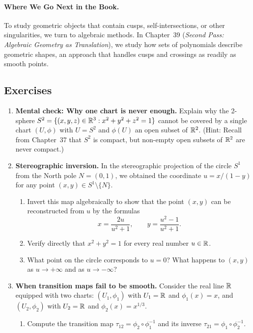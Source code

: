 \paragraph{Where We Go Next in the Book.}
To study geometric objects that contain cusps, self-intersections, or other singularities, we turn to algebraic methods. In Chapter~39 (\emph{Second Pass: Algebraic Geometry as Translation}), we study how sets of polynomials describe geometric shapes, an approach that handles cusps and crossings as readily as smooth points.

\subsection{Exercises}

\begin{enumerate}
  \item \textbf{Mental check: Why one chart is never enough.} Explain why the 2-sphere $S^2 = \{(x, y, z) \in \mathbb{R}^3 : x^2 + y^2 + z^2 = 1\}$ cannot be covered by a single chart $(U, \phi)$ with $U = S^2$ and $\phi(U)$ an open subset of $\mathbb{R}^2$. (Hint: Recall from Chapter~37 that $S^2$ is compact, but non-empty open subsets of $\mathbb{R}^2$ are never compact.)
  \item \textbf{Stereographic inversion.} In the stereographic projection of the circle $S^1$ from the North pole $N = (0, 1)$, we obtained the coordinate $u = x/(1-y)$ for any point $(x, y) \in S^1 \setminus \{N\}$.
  \begin{enumerate}
    \item Invert this map algebraically to show that the point $(x, y)$ can be reconstructed from $u$ by the formulas
    \[
    x = \frac{2u}{u^2 + 1}, \qquad y = \frac{u^2 - 1}{u^2 + 1}.
    \]
    \item Verify directly that $x^2 + y^2 = 1$ for every real number $u \in \mathbb{R}$.
    \item What point on the circle corresponds to $u = 0$? What happens to $(x, y)$ as $u \to +\infty$ and as $u \to -\infty$?
  \end{enumerate}
  \item \textbf{When transition maps fail to be smooth.} Consider the real line $\mathbb{R}$ equipped with two charts: $(U_1, \phi_1)$ with $U_1 = \mathbb{R}$ and $\phi_1(x) = x$, and $(U_2, \phi_2)$ with $U_2 = \mathbb{R}$ and $\phi_2(x) = x^{1/3}$.
  \begin{enumerate}
    \item Compute the transition map $\tau_{12} = \phi_2 \circ \phi_1^{-1}$ and its inverse $\tau_{21} = \phi_1 \circ \phi_2^{-1}$.

\end{enumerate}
\end{enumerate}
